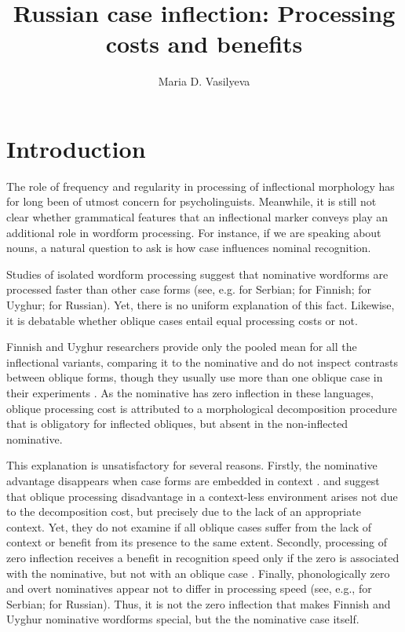 \documentclass[output=paper, modfonts,newtxmath,hidelinks]{langscibook}
\title{Russian case inflection: Processing costs and benefits}
\author{Maria D. Vasilyeva \affiliation{Lomonosov Moscow State University}
}
\begin{document}
\maketitle
{}

\section{\label{sec:intro}Introduction}
The role of frequency and regularity in processing of inflectional morphology has for long been of utmost concern for psycholinguists. Meanwhile, it is still not clear whether grammatical features that an inflectional marker conveys play an additional role in wordform processing. For instance, if we are speaking about nouns, a natural question to ask is how case influences nominal recognition.

Studies of isolated wordform processing suggest that nominative wordforms are processed faster than other case forms (see, e.g. \citealt{lukatela1978lexical}  for Serbian; \citealt{niemi1994cognitive} for Finnish; \citealt{abulizi2016cognitive} for Uyghur; \citealt{gor2017processing} for Russian). Yet, there is no uniform explanation of this fact. Likewise, it is debatable whether oblique cases entail equal processing costs or not.

Finnish and Uyghur researchers provide only  the pooled mean for all the inflectional variants, comparing it to the nominative and do not inspect contrasts between oblique forms, though they usually use more than one oblique case in their experiments \citep{niemi1991recognition, niemi1994cognitive, hyovcnavc1995effects, laine1998lexical, laine1999lexical, abulizi2016cognitive}. As the nominative has zero inflection in these languages, oblique processing cost is attributed to a morphological decomposition procedure that is obligatory for inflected obliques, but absent in the non-inflected nominative.

This explanation is unsatisfactory for several reasons. Firstly, the nominative advantage disappears when  case forms are embedded in context  \citep{bertram2000role, hyona2002morphological}. \citet{bertram2000role} and \citet{hyona2002morphological} suggest that oblique processing disadvantage in a context-less environment arises not due to the decomposition cost, but precisely due to the lack of an appropriate context. Yet, they do not examine if all oblique cases suffer from the lack of context or benefit from its presence to the same extent. Secondly, processing of zero inflection receives a benefit in recognition speed only if the zero is associated with the nominative, but not with an oblique case \citep{gor2017processing}.  Finally, phonologically zero and overt nominatives appear not to differ in processing speed (see, e.g., \citealt{lukatelaEtAl1980} for Serbian; \citealt{gor2017processing} for Russian). Thus, it is not the zero inflection that makes Finnish and Uyghur nominative wordforms special, but the the nominative case itself.
\end{document}
